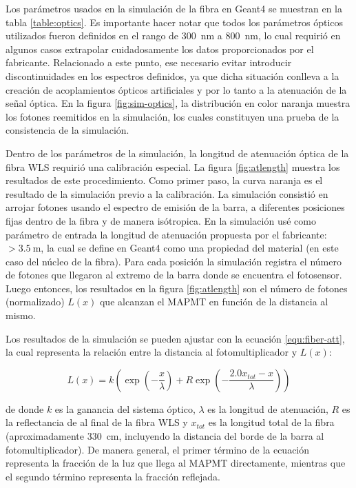 \begin{table}
\begin{tabular}{lr}
\end{tabular}
\end{table}

Los parámetros usados en la simulación de la fibra en Geant4 se muestran en la tabla \ref{table:optics}. Es importante hacer notar que todos los parámetros ópticos utilizados fueron definidos en el rango de \SI{300}{\nano\metre} a \SI{800}{\nano\metre}, lo cual requirió en algunos casos extrapolar cuidadosamente los datos proporcionados por el fabricante. Relacionado a este punto, ese necesario evitar introducir discontinuidades en los espectros definidos, ya que dicha situación conlleva a la creación de acoplamientos ópticos artificiales y por lo tanto a la atenuación de la señal óptica. En la figura \ref{fig:sim-optics}, la distribución en color naranja muestra los fotones reemitidos en la simulación, los cuales constituyen una prueba de la consistencia de la simulación.

Dentro de los parámetros de la simulación, la longitud de atenuación óptica de la fibra WLS requirió una calibración especial. La figura \ref{fig:atlength} muestra los resultados de este procedimiento. Como primer paso, la curva naranja es el resultado de la simulación previo a la calibración. La simulación consistió en arrojar fotones usando el espectro de emisión de la barra, a diferentes posiciones fijas dentro de la fibra y de manera isótropica. En la simulación usé como parámetro de entrada la longitud de atenuación propuesta por el fabricante: $>\SI{3.5}{\metre}$, la cual se define en Geant4 como una propiedad del material (en este caso del núcleo de la fibra). Para cada posición la simulación registra el número de fotones que llegaron al extremo de la barra donde se encuentra el fotosensor. Luego entonces, los resultados en la figura \ref{fig:atlength} son el número de fotones (normalizado) $L(x)$ que alcanzan el MAPMT en función de la distancia al mismo.

Los resultados de la simulación se pueden ajustar con la ecuación \ref{equ:fiber-att}, la cual representa la relación entre la distancia al fotomultiplicador y $L(x)$:

\begin{equation}
\label{equ:fiber-att}
L(x)=k\left(\exp\left(-\frac{x}{\lambda}\right) +R\exp\left(-\frac{2.0x_{tot}-x}{\lambda}\right)\right)
\end{equation}

de donde $k$ es la ganancia del sistema óptico, $\lambda$ es la longitud de atenuación, $R$ es la reflectancia de al final de la fibra WLS y $x_{tot}$ es la longitud total de la fibra (aproximadamente \SI{330}{\cm}, incluyendo la distancia del borde de la barra al fotomultiplicador). De manera general, el primer término de la ecuación representa la fracción de la luz que llega al MAPMT directamente, mientras que el segundo término representa la fracción reflejada.

